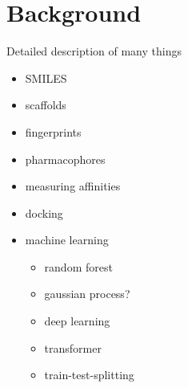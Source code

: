 \chapter{Background} \label{ch:background}

Detailed description of many things

\begin{itemize}
    \item SMILES
    \item scaffolds
    \item fingerprints
    \item pharmacophores
    \item measuring affinities
    \item docking
    \item machine learning
    \begin{itemize}
        \item random forest
        \item gaussian process?
        \item deep learning
        \item transformer
        \item train-test-splitting
    \end{itemize}
    
\end{itemize}




